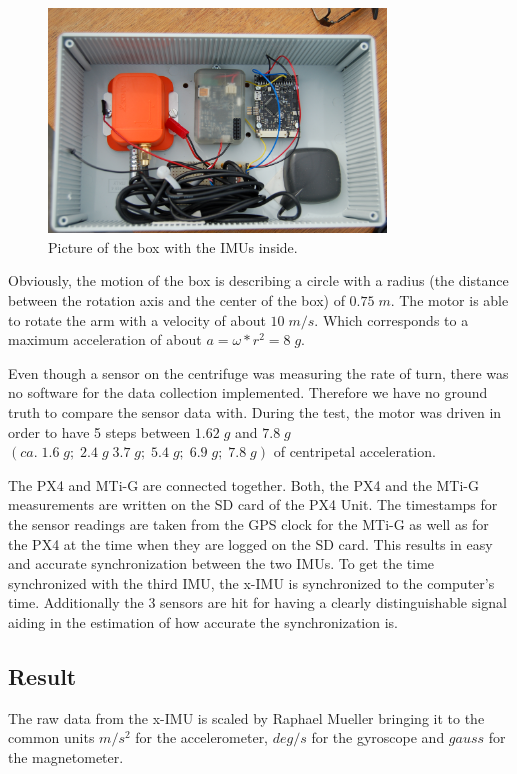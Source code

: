 \begin{figure}[hb]
\begin{center}
\includegraphics[width=0.8\textwidth]{pictures/box.JPG}
\caption{Picture of the box with the IMUs inside.}
\label{box}
\end{center}
\end{figure}
Obviously, the motion of the box is describing a circle with a radius (the distance between the rotation axis and the  center of the box) of $0.75\;m$. The motor is able to rotate the arm with a velocity of about $10\; m/s$. Which corresponds to a maximum acceleration of about $ a=\omega*r^2=8\;g$. 

Even though a sensor on the centrifuge was measuring the rate of turn, there was no software for the data collection implemented. Therefore we have no ground truth to compare the sensor data with. 
During the test, the motor was driven in order to have 5 steps between $1.62\;g$ and $7.8\;g$ $(ca.\;1.6\;g;\;2.4\;g\;3.7\;g;\;5.4\;g;\;6.9\;g;\;7.8\;g)$ of centripetal acceleration.

The PX4 and MTi-G are connected together. Both, the PX4 and the MTi-G measurements are written on the SD card of the PX4 Unit. The timestamps for the sensor readings are taken from the GPS clock for the MTi-G as well as for the PX4 at the time when they are logged on the SD card. This results in easy and accurate synchronization between the two IMUs. To get the time synchronized with the third IMU, the x-IMU is synchronized to the computer's time. Additionally the 3 sensors are hit for having a clearly distinguishable signal aiding in the estimation of how accurate the synchronization is.
\FloatBarrier
\subsection{Result}
The raw data from the x-IMU is scaled by Raphael Mueller bringing it to the common units $m/s^2$ for the accelerometer, $deg/s$ for the gyroscope and $gauss$ for the magnetometer.

